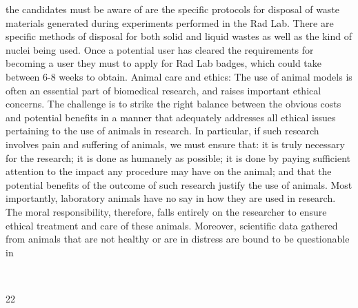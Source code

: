 \documentclass[a4paper,10pt]{article}
\begin{document}
the candidates must be aware of are the specific protocols for disposal of waste materials
generated during experiments performed in the Rad Lab. There are specific methods of
disposal for both solid and liquid wastes as well as the kind of nuclei being used. Once a
potential user has cleared the requirements for becoming a user they must to apply for Rad
Lab badges, which could take between 6-8 weeks to obtain.
Animal care and ethics: The use of animal models is often an essential part of biomedical
research, and raises important ethical concerns. The challenge is to strike the right balance
between the obvious costs and potential benefits in a manner that adequately addresses all
ethical issues pertaining to the use of animals in research. In particular, if such research
involves pain and suffering of animals, we must ensure that: it is truly necessary for the
research; it is done as humanely as possible; it is done by paying sufficient attention to the
impact any procedure may have on the animal; and that the potential benefits of the outcome
of such research justify the use of animals. Most importantly, laboratory animals have no
say in how they are used in research. The moral responsibility, therefore, falls entirely on the
researcher to ensure ethical treatment and care of these animals. Moreover, scientific data
gathered from animals that are not healthy or are in distress are bound to be questionable in
	
  

22	
  
\end{document}
